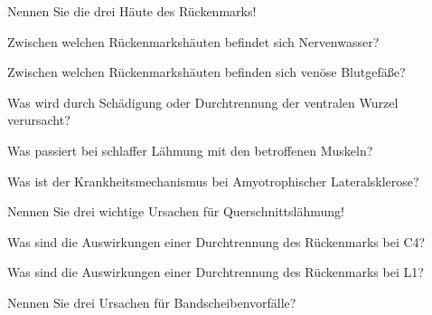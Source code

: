 \documentclass[10pt, a4paper]{exam}
\begin{document}
\begin{questions}
  \question Nennen Sie die drei Häute des Rückenmarks!
  \begin{solution}

  \end{solution}

  \question Zwischen welchen Rückenmarkshäuten befindet sich Nervenwasser?
  \begin{solution}

  \end{solution}

  \question Zwischen welchen Rückenmarkshäuten befinden sich venöse Blutgefäße?
  \begin{solution}

  \end{solution}

  \question Was wird durch Schädigung oder Durchtrennung der ventralen Wurzel verursacht?
  \begin{solution}

  \end{solution}

  \question Was passiert bei schlaffer Lähmung mit den betroffenen Muskeln?
  \begin{solution}

  \end{solution}

  \question Was ist der Krankheitsmechanismus bei Amyotrophischer Lateralsklerose?
  \begin{solution}

  \end{solution}

  \question Nennen Sie drei wichtige Ursachen für Querschnittslähmung!
  \begin{solution}

  \end{solution}

  \question Was sind die Auswirkungen einer Durchtrennung des Rückenmarks bei C4?
  \begin{solution}

  \end{solution}

  \question Was sind die Auswirkungen einer Durchtrennung des Rückenmarks bei L1?
  \begin{solution}

  \end{solution}

  \question Nennen Sie drei Ursachen für Bandscheibenvorfälle?
  \begin{solution}


\end{solution}
\end{questions}
\end{document}
